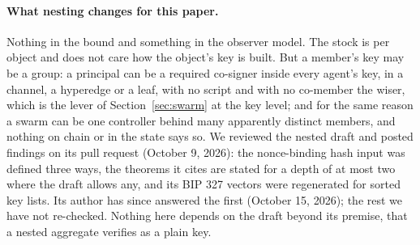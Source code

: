 \documentclass[11pt]{article}
\theoremstyle{plain}
\theoremstyle{definition}
\theoremstyle{remark}
\begin{document}
\paragraph{What nesting changes for this paper.} Nothing in the bound and something in the observer model. The stock is per object and does not care how the object's key is built. But a member's key may be a group: a principal can be a required co-signer inside every agent's key, in a channel, a hyperedge or a leaf, with no script and with no co-member the wiser, which is the lever of Section~\ref{sec:swarm} at the key level; and for the same reason a swarm can be one controller behind many apparently distinct members, and nothing on chain or in the state says so. We reviewed the nested draft and posted findings on its pull request (October 9, 2026): the nonce-binding hash input was defined three ways, the theorems it cites are stated for a depth of at most two where the draft allows any, and its BIP 327 vectors were regenerated for sorted key lists. Its author has since answered the first (October 15, 2026); the rest we have not re-checked. Nothing here depends on the draft beyond its premise, that a nested aggregate verifies as a plain key.
\end{document}
